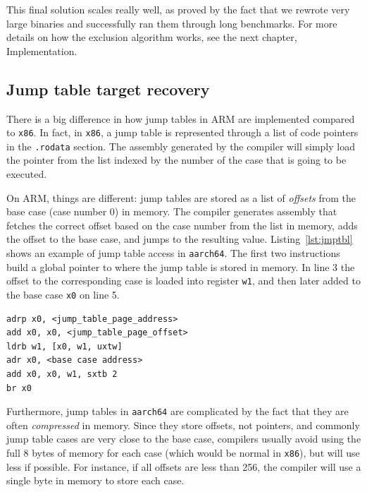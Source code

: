 \documentclass[a4paper,11pt,oneside]{report}
\begin{document}
This final solution scales really well, as proved by the fact that we rewrote 
very large binaries and successfully ran them through long benchmarks. For more 
details on how the exclusion algorithm works, see the next chapter, 
Implementation.  


\subsection{Jump table target recovery}
There is a big difference in how jump tables in ARM are implemented compared to 
\texttt{x86}. In fact, in \texttt{x86}, a jump table is represented through a 
list of code pointers in the \texttt{.rodata} section. The assembly generated 
by the compiler will simply load the pointer from the list indexed by the 
number of the case that is going to be executed. 

On ARM, things are different: jump tables are stored as a list of 
\emph{offsets} from the base case (case number 0) in memory. The compiler 
generates assembly that fetches the correct offset based on the case number 
from the list in memory, adds the offset to the base case, and jumps to the 
resulting value. Listing~\ref{lst:jmptbl} shows an example of jump table access 
in \texttt{aarch64}. The first two instructions build a global pointer to where 
the jump table is stored in memory. In line 3 the offset to the corresponding 
case is loaded into register \texttt{w1}, and then later added to the base case 
\texttt{x0} on line 5. 


\begin{lstlisting}[float,floatplacement=H,label={lst:jmptbl},caption={Example of a jump table in \texttt{aarch64}}]
adrp x0, <jump_table_page_address>
add x0, x0, <jump_table_page_offset>
ldrb w1, [x0, w1, uxtw]
adr x0, <base case address>
add x0, x0, w1, sxtb 2
br x0
\end{lstlisting}

Furthermore, jump tables in \texttt{aarch64} are complicated by the fact that 
they are often \emph{compressed} in memory. Since they store offsets, not 
pointers, and commonly jump table cases are very close to the base case, 
compilers usually avoid using the full 8 bytes of memory for each case (which 
would be normal in \texttt{x86}), but will use less if possible. For instance, 
if all offsets are less than 256, the compiler will use a single byte in memory 
to store each case.  
\end{document}
